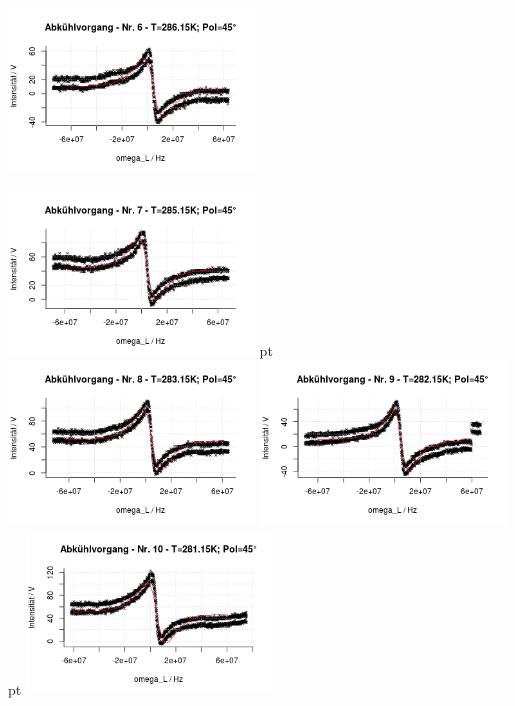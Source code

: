 \documentclass[12pt]{article}
\begin{document}
\begin{minipage}[h!]{\textwidth}
	\includegraphics[width=0.49\textwidth]{figures/cold45-6.png}\vskip -10pt
\end{minipage}\newpage
\begin{minipage}[h!]{\textwidth}
	\centering
		
		\includegraphics[width=0.49\textwidth]{figures/cold45-7.png} pt
		\includegraphics[width=0.49\textwidth]{figures/cold45-8.png}\vskip -10pt
		\includegraphics[width=0.49\textwidth]{figures/cold45-9.png} pt
		\includegraphics[width=0.49\textwidth]{figures/cold45-10.png}\vskip -10pt

\end{minipage}
\end{document}
